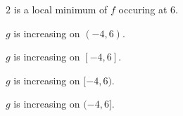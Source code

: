 \documentclass{ximera}
\begin{document}
\begin{exercise}
\begin{question}
$2$ is a local minimum of $f$ occuring at $6$. \\


\begin{multipleChoice}
\end{multipleChoice}


\end{question}










\begin{question} 


$g$ is increasing on $(-4, 6)$. \\


\begin{multipleChoice}
\end{multipleChoice}




$g$ is increasing on $[-4, 6]$. \\


\begin{multipleChoice}
\end{multipleChoice}





$g$ is increasing on $[-4, 6)$. \\


\begin{multipleChoice}
\end{multipleChoice}




$g$ is increasing on $(-4, 6]$. \\


\begin{multipleChoice}
\end{multipleChoice}



\end{question}


















\end{exercise}
\end{document}

